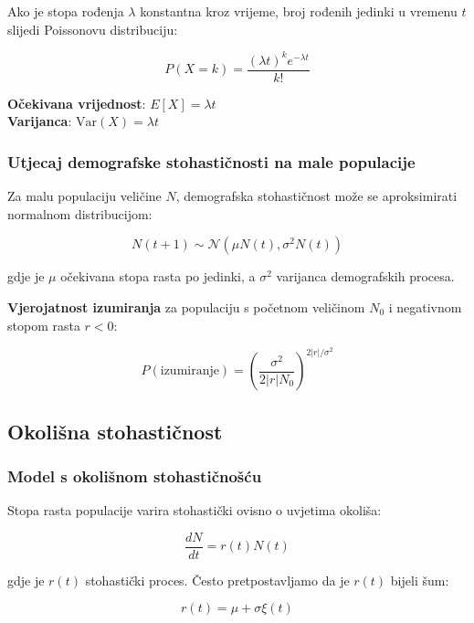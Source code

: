 \documentclass[11pt,oneside]{book}
\begin{document}
Ako je stopa rođenja $\lambda$ konstantna kroz vrijeme, broj rođenih jedinki u vremenu $t$ slijedi Poissonovu distribuciju:

\begin{equation}
	P(X = k) = \frac{(\lambda t)^k e^{-\lambda t}}{k!}
\end{equation}

\textbf{Očekivana vrijednost}: $E[X] = \lambda t$\\
\textbf{Varijanca}: $\text{Var}(X) = \lambda t$

\subsubsection{Utjecaj demografske stohastičnosti na male populacije}

Za malu populaciju veličine $N$, demografska stohastičnost može se aproksimirati normalnom distribucijom:

\begin{equation}
	N(t+1) \sim \mathcal{N}(\mu N(t), \sigma^2 N(t))
\end{equation}

gdje je $\mu$ očekivana stopa rasta po jedinki, a $\sigma^2$ varijanca demografskih procesa.

\textbf{Vjerojatnost izumiranja} za populaciju s početnom veličinom $N_0$ i negativnom stopom rasta $r < 0$:

\begin{equation}
	P(\text{izumiranje}) = \left(\frac{\sigma^2}{2|r|N_0}\right)^{2|r|/\sigma^2}
\end{equation}

\subsection{Okolišna stohastičnost}

\subsubsection{Model s okolišnom stohastičnošću}

Stopa rasta populacije varira stohastički ovisno o uvjetima okoliša:

\begin{equation}
	\frac{dN}{dt} = r(t) N(t)
\end{equation}

gdje je $r(t)$ stohastički proces. Često pretpostavljamo da je $r(t)$ bijeli šum:

\begin{equation}
	r(t) = \mu + \sigma \xi(t)
\end{equation}
\end{document}
